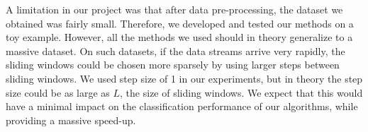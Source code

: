 \documentclass[conference]{IEEEtran}
\begin{document}
		A limitation in our project was that after data pre-processing, the dataset we obtained was fairly small. Therefore, we developed and tested our methods on a toy example. However, all the methods we used should in theory generalize to a massive dataset. On such datasets, if the data streams arrive very rapidly, the sliding windows could be chosen more sparsely by using larger steps between sliding windows. We used step size of 1 in our experiments, but in theory the step size could be as large as $L$, the size of sliding windows. We expect that this would have a minimal impact on the classification performance of our algorithms, while providing a massive speed-up.
		
		
		
		
\end{document}
